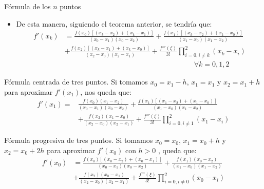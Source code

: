 \documentclass[12pt]{beamer}
\begin{document}
\begin{frame}{F\'ormula de los $n$ puntos}
  \begin{itemize}
    \item De esta manera, siguiendo el teorema anterior, se tendr\'ia que:
    {\footnotesize
      \begin{align*}
f'(x_k) &= \frac{f(x_0)[(x_k-x_2)+(x_k-x_1)]}{(x_0-x_1)(x_0-x_2)} + \frac{f(x_1)[(x_k-x_2)+(x_k-x_0)]}{(x_1-x_0)(x_1-x_2)}\\
 & + \frac{f(x_2)[(x_k-x_1)+(x_k-x_0)]}{(x_2-x_0)(x_2-x_1)} + \frac{f'''(\xi)}{3!}\prod_{i=0,i\neq k}^2(x_k-x_i)\\
& \qquad\qquad\qquad\qquad\qquad\qquad\qquad\qquad\qquad\forall k=0,1,2
\end{align*}}
    \end{itemize}
\end{frame}
\begin{frame}{F\'ormula centrada de tres puntos.}
Si tomamos $x_0 = x_1-h$, $x_1 = x_1$ y $x_2 = x_1 + h$ para aproximar $f'(x_1)$, nos queda que:
\begin{align*}
f'(x_1) =&  \frac{f(x_0)(x_1-x_2)}{(x_0-x_1)(x_0-x_2)} + \frac{f(x_1)[(x_1-x_2)+(x_1-x_0)]}{(x_1-x_0)(x_1-x_2)}\\
 &+ \frac{f(x_2)(x_1-x_0)}{(x_2-x_0)(x_2-x_1)} + \frac{f'''(\xi)}{3!}\prod_{i=0,i\neq 1}^2(x_1-x_i)
\end{align*}
\end{frame}
\begin{frame}{F\'ormula progresiva de tres puntos.}
Si tomamos $x_0 = x_0$, $x_1 = x_0+h$ y $x_2 = x_0 + 2h$ para aproximar $f'(x_0)$ con $h > 0$ , queda que:
\begin{align*}
f'(x_0) &=  \frac{f(x_0)[(x_0-x_2)+(x_0-x_1)]}{(x_0-x_1)(x_0-x_2)} + \frac{f(x_1)(x_0-x_2)}{(x_1-x_0)(x_1-x_2)}\\
& + \frac{f(x_2)(x_0-x_1)}{(x_2-x_0)(x_2-x_1)} + \frac{f'''(\xi)}{3!}\prod_{i=0,i\neq 0}^2(x_0-x_i)
\end{align*}
\end{frame}
\end{document}
